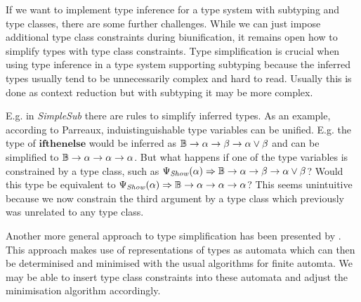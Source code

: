 If we want to implement type inference for a type system with subtyping and type classes, there are some further challenges.
While we can just impose additional type class constraints during biunification, it remains open how to simplify types with type class constraints.
Type simplification is crucial when using type inference in a type system supporting subtyping because the inferred types usually tend to be unnecessarily complex and hard to read.
Usually this is done as context reduction \cite{jones2003qualified} but with subtyping it may be more complex.

E.g. in \emph{SimpleSub} \cite{10.1145/3409006} there are rules to simplify inferred types.
As an example, according to Parreaux, induistinguishable type variables can be unified.
E.g. the type of $\mathbf{ifthenelse}$ would be inferred as $\mathbb{B} \to \alpha \to \beta \to \alpha \vee \beta$ and can be simplified to $\mathbb{B} \to \alpha \to \alpha \to \alpha$.
But what happens if one of the type variables is constrained by a type class, such as $\Psi_\mathit{Show}(\alpha) \Rightarrow \mathbb{B} \to \alpha \to \beta \to \alpha \vee \beta$?
Would this type be equivalent to $\Psi_\mathit{Show}(\alpha) \Rightarrow \mathbb{B} \to \alpha \to \alpha \to \alpha$?
This seems unintuitive because we now constrain the third argument by a type class which previously was unrelated to any type class.

Another more general approach to type simplification has been presented by \cite{dolan2017subtyping}.
This approach makes use of representations of types as automata which can then be determinised and minimised with the usual algorithms for finite automta.
We may be able to insert type class constraints into these automata and adjust the minimisation algorithm accordingly.
\clearpage
